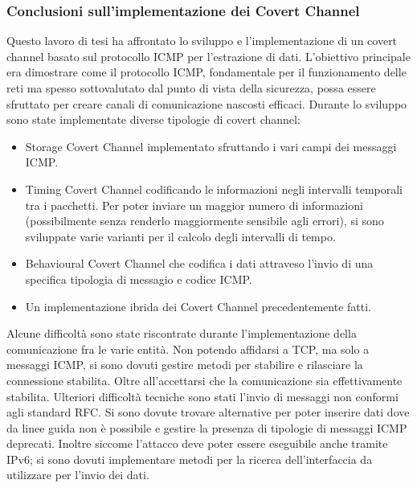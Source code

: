 \subsubsection{Conclusioni sull'implementazione dei Covert Channel}
Questo lavoro di tesi ha affrontato lo sviluppo e l'implementazione di un 
covert channel basato sul protocollo ICMP per l'estrazione di dati. 
L'obiettivo principale era dimostrare come il protocollo ICMP, fondamentale 
per il funzionamento delle reti ma spesso sottovalutato dal punto di vista 
della sicurezza, possa essere sfruttato per creare canali di comunicazione 
nascosti efficaci.
\vspace{3ex} \newline 
Durante lo sviluppo sono state implementate diverse tipologie di covert channel:
\begin{itemize}
    \item Storage Covert Channel implementato sfruttando i vari campi dei 
    messaggi ICMP. 
    \item Timing Covert Channel codificando le informazioni negli intervalli 
    temporali tra i pacchetti. Per poter inviare un maggior numero di informazioni 
    (possibilmente senza renderlo maggiormente sensibile agli errori), si sono 
    sviluppate varie varianti per il calcolo degli intervalli di tempo. 
    \item Behavioural Covert Channel che codifica i dati attraveso l'invio di 
    una specifica tipologia di messagio e codice ICMP. 
    \item Un implementazione ibrida dei Covert Channel precedentemente fatti. 
\end{itemize}
\vspace{4ex}  
Alcune difficoltà sono state riscontrate durante l'implementazione della 
comunicazione fra le varie entità. Non potendo affidarsi a TCP, ma solo a 
messaggi ICMP, si sono dovuti gestire metodi per stabilire e rilasciare la 
connessione stabilita. Oltre all'accettarsi che la comunicazione sia 
effettivamente stabilita. 
\vspace{4ex}  \newline 
Ulteriori difficoltà tecniche sono stati l'invio di messaggi non conformi 
agli standard RFC. Si sono dovute trovare alternative per poter inserire 
dati dove da linee guida non è possibile e gestire la presenza di tipologie 
di messaggi ICMP deprecati. Inoltre siccome l'attacco deve poter essere 
eseguibile anche tramite IPv6; si sono dovuti implementare metodi per la 
ricerca dell'interfaccia da utilizzare per l'invio dei dati. 

